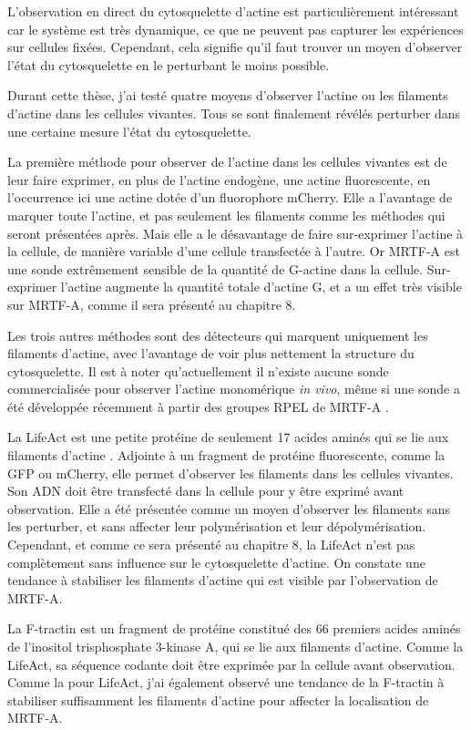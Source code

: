 L'observation en direct du cytosquelette d'actine est particulièrement intéressant car le système est très dynamique, ce que ne peuvent pas capturer les expériences sur cellules fixées.
Cependant, cela signifie qu'il faut trouver un moyen d'observer l'état du cytosquelette en le perturbant le moins possible. 

Durant cette thèse, j'ai testé quatre moyens d'observer l'actine ou les filaments d'actine dans les cellules vivantes. Tous se sont finalement révélés perturber dans une certaine mesure l'état du cytosquelette. 

La première méthode pour observer de l'actine dans les cellules vivantes est de leur faire exprimer, en plus de l'actine endogène, une actine fluorescente, en l'occurrence ici une actine dotée d'un fluorophore mCherry. 
Elle a l'avantage de marquer toute l'actine, et pas seulement les filaments comme les méthodes qui seront présentées après. 
Mais elle a le désavantage de faire sur-exprimer l'actine à la cellule, de manière variable d'une cellule transfectée à l'autre. 
Or MRTF-A est une sonde extrêmement sensible de la quantité de G-actine dans la cellule.  Sur-exprimer l'actine augmente la quantité totale d'actine G, et a un effet très visible sur MRTF-A, comme il sera présenté au chapitre 8. 

Les trois autres méthodes sont des détecteurs qui marquent uniquement les filaments d'actine, avec l'avantage de voir plus nettement la structure du cytosquelette. Il est à noter qu'actuellement il n'existe aucune sonde commercialisée pour observer l'actine monomérique \textit{in vivo}, même si une sonde a été développée récemment à partir des groupes RPEL de MRTF-A \parencite{belin_visualization_2013}. 

La LifeAct est une petite protéine de seulement 17 acides aminés qui se lie aux filaments d'actine \parencite{riedl_lifeact:_2008}. Adjointe à un fragment de protéine fluorescente, comme la GFP ou mCherry, elle permet d'observer les filaments dans les cellules vivantes.  Son ADN doit être transfecté dans la cellule pour y être exprimé avant observation. Elle a été présentée comme un moyen d'observer les filaments sans les perturber, et sans affecter leur polymérisation et leur dépolymérisation. Cependant, et comme ce sera présenté au chapitre 8, la LifeAct n'est pas complètement sans influence sur le cytosquelette d'actine. On constate une tendance à stabiliser les filaments d'actine qui est visible par l'observation de MRTF-A. 

La F-tractin \parencite{johnson_neuronal_2009} est un fragment de protéine constitué des 66 premiers acides aminés de l'inositol trisphosphate 3-kinase A, qui se lie aux filaments d'actine. Comme la LifeAct, sa séquence codante doit être exprimée par la cellule avant observation. Comme la pour LifeAct, j'ai également observé une tendance de la F-tractin à stabiliser suffisamment les filaments d'actine pour affecter la localisation de MRTF-A. 


